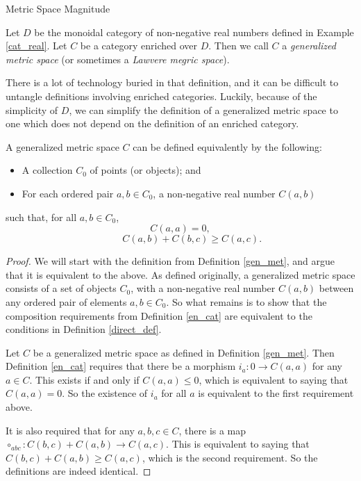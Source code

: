 \documentclass[12pt]{pom_thesis}
\begin{document}
\begin{chapter}{Metric Space Magnitude}
\begin{defn}\label{gen_met}
Let $D$ be the monoidal category of non-negative real numbers defined in Example \ref{cat_real}. Let $C$ be a category enriched over $D$. Then we call $C$ a \emph{generalized metric space} (or sometimes a \emph{Lawvere megric space}).
\end{defn}
There is a lot of technology buried in that definition, and it can be difficult to untangle definitions involving enriched categories. Luckily, because of the simplicity of $D$, we can simplify the definition of a generalized metric space to one which does not depend on the definition of an enriched category.
\begin{thm}\label{direct_def}
A generalized metric space $C$ can be defined equivalently by the following:
\begin{itemize}
\item A collection $C_0$ of points (or objects); and
\item For each ordered pair $a,b \in C_0$, a non-negative real number $C(a,b)$
\end{itemize}
such that, for all $a,b \in C_0$,
\[C(a,a) = 0,
\]
\[\hspace{1cm} C(a,b) + C(b,c) \geq C(a,c).
\]
\end{thm}
\begin{proof}
We will start with the definition from Definition \ref{gen_met}, and argue that it is equivalent to the above. As defined originally, a generalized metric space consists of a set of objects $C_0$, with a non-negative real number $C(a,b)$ between any ordered pair of elements $a,b \in C_0$. So what remains is to show that the composition requirements from Definition \ref{en_cat} are equivalent to the conditions in Definition  \ref{direct_def}. 

Let $C$ be a generalized metric space as defined in Definition \ref{gen_met}. Then Definition \ref{en_cat} requires that there be a morphism $i_a:0 \rightarrow C(a,a)$ for any $a \in C$. This exists if and only if $C(a,a) \leq 0$, which is equivalent to saying that $C(a,a)=0$. So the existence of $i_a$ for all $a$ is equivalent to the first requirement above.

It is also required that for any $a,b,c \in C$, there is a map $\circ_{abc}: C(b,c) + C(a,b) \rightarrow C(a,c)$. This is equivalent to saying that $C(b,c) + C(a,b) \geq C(a,c)$, which is the second requirement. So the definitions are indeed identical.
\end{proof}


\end{chapter}
\end{document}
